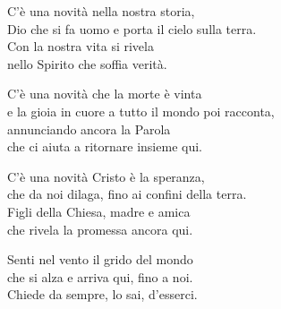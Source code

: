 
\strofa C'è una novità nella nostra storia,\\
Dio che si fa uomo e porta il cielo sulla terra.\\
Con la nostra vita si rivela\\
nello Spirito che soffia verità.

\spazio

\strofa C'è una novità che la morte è vinta\\
e la gioia in cuore a tutto il mondo poi racconta,\\
annunciando ancora la Parola\\
che ci aiuta a ritornare insieme qui.

\spazio


\spazio

\strofa C'è una novità Cristo è la speranza,\\
che da noi dilaga, fino ai confini della terra.\\
Figli della Chiesa, madre e amica\\
che rivela la promessa ancora qui.

\spazio


\spazio

Senti nel vento il grido del mondo\\
che si alza e arriva qui, fino a noi.\\
Chiede da sempre, lo sai, d'esserci.

\spazio

